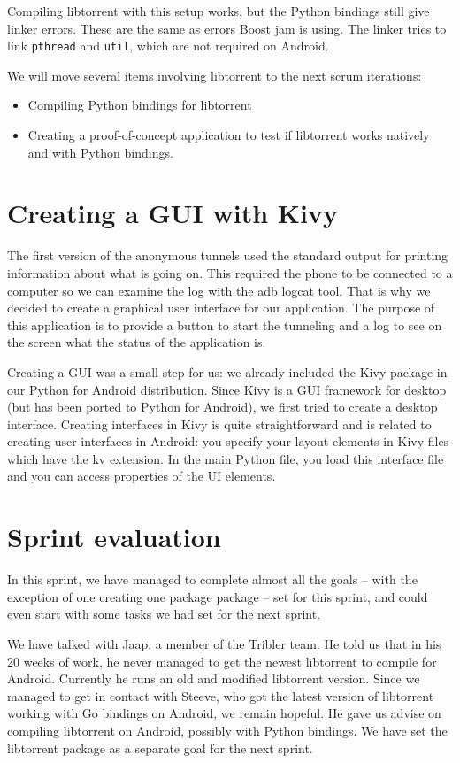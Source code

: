 		Compiling libtorrent with this setup works, but the Python bindings still give linker errors. These are the same as errors Boost jam is using. The linker tries to link \texttt{pthread} and \texttt{util}, which are not required on Android.
		
		We will move several items involving libtorrent to the next scrum iterations:
		\begin{itemize}
		\item Compiling Python bindings for libtorrent
		\item Creating a proof-of-concept application to test if libtorrent works natively and with Python bindings.
		\end{itemize}
	
	\section{Creating a GUI with Kivy}
		The first version of the anonymous tunnels used the standard output for printing information about what is going on. This required the phone to be connected to a computer so we can examine the log with the adb logcat tool. That is why we decided to create a graphical user interface for our application. The purpose of this application is to provide a button to start the tunneling and a log to see on the screen what the status of the application is.
	
		Creating a GUI was a small step for us: we already included the Kivy package in our Python for Android distribution. Since Kivy is a GUI framework for desktop (but has been ported to Python for Android), we first tried to create a desktop interface. Creating interfaces in Kivy is quite straightforward and is related to creating user interfaces in Android: you specify your layout elements in Kivy files which have the kv extension. In the main Python file, you load this interface file and you can access properties of the UI elements.
	
	\section{Sprint evaluation}
		In this sprint, we have managed to complete almost all the goals -- with the exception of one creating one package package -- set for this sprint, and could even start with some tasks we had set for the next sprint.
		
		We have talked with Jaap, a member of the Tribler team. He told us that in his 20 weeks of work, he never managed to get the newest libtorrent to compile for Android.
		Currently he runs an old and modified libtorrent version. Since we managed to get in contact with Steeve, who got the latest version of libtorrent working with Go bindings on Android, we remain hopeful. He gave us advise on compiling libtorrent on Android, possibly with Python bindings. We have set the libtorrent package as a separate goal for the next sprint.
